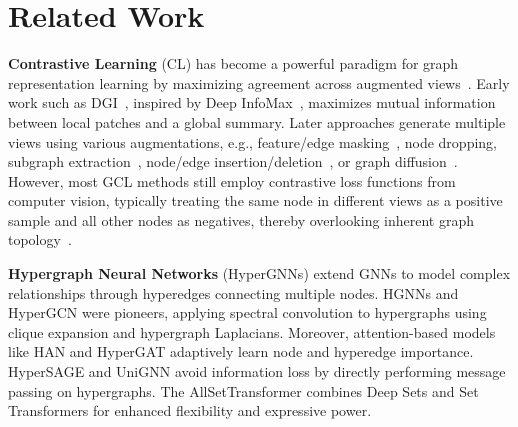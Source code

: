 \section{Related Work}
\textbf{Contrastive Learning} (CL) has become a powerful paradigm for graph representation learning by maximizing agreement across augmented views~\cite{Zhu:2020vf}. Early work such as DGI~\cite{velivckovic2018deep}, inspired by Deep InfoMax~\cite{hjelm2018learning}, maximizes mutual information between local patches and a global summary. Later approaches generate multiple views using various augmentations, e.g., feature/edge masking~\cite{thakoor2021large}, node dropping, subgraph extraction~\cite{You2020GraphCL}, node/edge insertion/deletion~\cite{zeng2021contrastive}, or graph diffusion~\cite{hassani2020contrastive,ma2023self}. However, most GCL methods still employ contrastive loss functions from computer vision, typically treating the same node in different views as a positive sample and all other nodes as negatives, thereby overlooking inherent graph topology~\cite{zhu2021graph,You2020GraphCL}.

\textbf{Hypergraph Neural Networks} (HyperGNNs) extend GNNs to model complex relationships through hyperedges connecting multiple nodes. HGNNs \cite{feng2019hypergraph} and HyperGCN \cite{yadati2019hypergcn} were pioneers, applying spectral convolution to hypergraphs using clique expansion and hypergraph Laplacians.
Moreover, attention-based models like HAN \cite{chen2020hypergraph} and HyperGAT \cite{ding2020more} adaptively learn node and hyperedge importance. HyperSAGE \cite{arya2020hypersage} and UniGNN \cite{huang2021unignn} avoid information loss by directly performing message passing on hypergraphs. The AllSetTransformer \cite{chien2021you} combines Deep Sets \cite{zaheer2017deep} and Set Transformers \cite{lee2019set} for enhanced flexibility and expressive power.